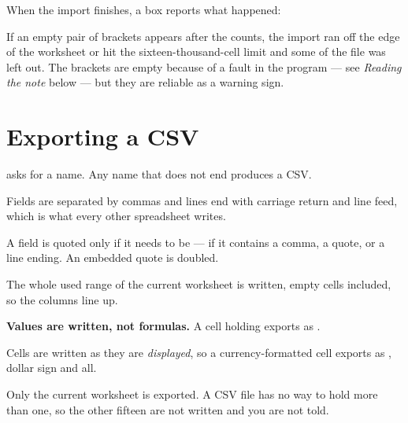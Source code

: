 When the import finishes, a box reports what happened:

\begin{ccfigure}
\caption{The result of a CSV import}
\label{fig:csvresult}
\end{ccfigure}

If an empty pair of brackets \msg{()} appears after the counts, the import ran
off the edge of the worksheet or hit the sixteen-thousand-cell limit and some
of the file was left out. The brackets are empty because of a fault in the
program --- see \emph{Reading the note} below --- but they are reliable as a
warning sign.

\section{Exporting a CSV}

 asks for a name. Any name that does not end  produces a
CSV.

\begin{ccsteps}
\item Fields are separated by commas and lines end with carriage return and
line feed, which is what every other spreadsheet writes.
\item A field is quoted only if it needs to be --- if it contains a comma, a
quote, or a line ending. An embedded quote is doubled.
\item The whole used range of the current worksheet is written, empty cells
included, so the columns line up.
\item \textbf{Values are written, not formulas.} A cell holding
 exports as .
\item Cells are written as they are \emph{displayed}, so a currency-formatted
cell exports as , dollar sign and all.
\end{ccsteps}

\begin{ccnote}
Only the current worksheet is exported. A CSV file has no way to hold more than
one, so the other fifteen are not written and you are not told.
\end{ccnote}

